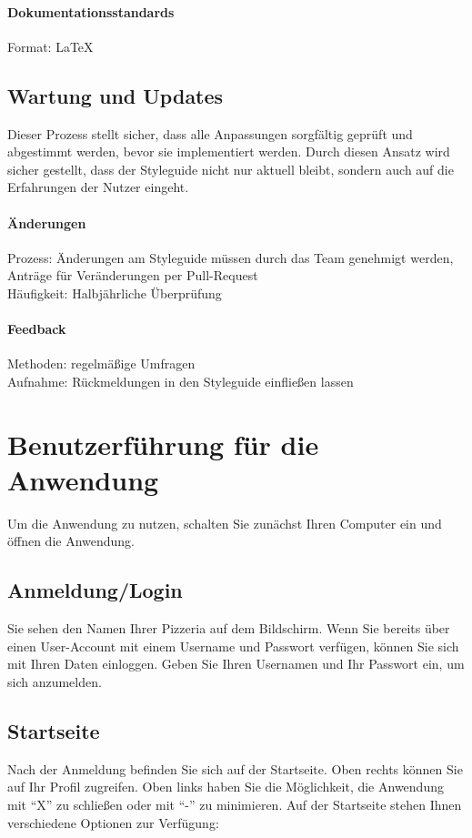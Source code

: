 \paragraph{Dokumentationsstandards}
Format: LaTeX

\subsection{Wartung und Updates}
Dieser Prozess stellt sicher, dass alle Anpassungen sorgfältig geprüft und abgestimmt werden, bevor sie implementiert werden.
Durch diesen Ansatz wird sicher gestellt, dass der Styleguide nicht nur aktuell bleibt, sondern auch auf die Erfahrungen der Nutzer eingeht.

\paragraph{Änderungen}
Prozess: Änderungen am Styleguide müssen durch das Team genehmigt werden, Anträge für Veränderungen per Pull-Request\\
Häufigkeit: Halbjährliche Überprüfung

\paragraph{Feedback}
Methoden: regelmäßige Umfragen\\
Aufnahme: Rückmeldungen in den Styleguide einfließen lassen

\section{Benutzerführung für die Anwendung}
\label{sec:benutzerfuehrung}
Um die Anwendung zu nutzen, schalten Sie zunächst Ihren Computer ein und öffnen die Anwendung.

\subsection{Anmeldung/Login}
Sie sehen den Namen Ihrer Pizzeria auf dem Bildschirm. Wenn Sie bereits über einen User-Account mit einem Username
und Passwort verfügen, können Sie sich mit Ihren Daten einloggen. Geben Sie Ihren Usernamen und Ihr Passwort ein,
um sich anzumelden.

\subsection{Startseite}
Nach der Anmeldung befinden Sie sich auf der Startseite. Oben rechts können Sie auf Ihr Profil zugreifen. Oben links
haben Sie die Möglichkeit, die Anwendung mit ``X'' zu schließen oder mit ``-'' zu minimieren. Auf der Startseite
stehen Ihnen verschiedene Optionen zur Verfügung:


